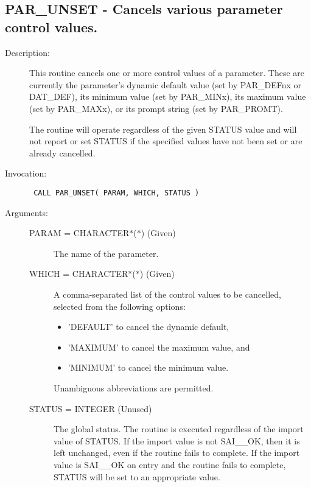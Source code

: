 \documentclass[twoside,11pt]{article}
\newcommand{\xlabel}[1]{}
\newlength{\sstbannerlength}
\newlength{\sstcaptionlength}
\newlength{\sstexampleslength}
\newlength{\sstexampleswidth}
\newcommand{\sstroutine}[3]{
   \goodbreak
   \rule{\textwidth}{0.5mm}
   \vspace{-7ex}
   \newline
   \settowidth{\sstbannerlength}{{\Large {\bf #1}}}
   \setlength{\sstcaptionlength}{\textwidth}
   \setlength{\sstexampleslength}{\textwidth}
   \addtolength{\sstbannerlength}{0.5em}
   \addtolength{\sstcaptionlength}{-2.0\sstbannerlength}
   \addtolength{\sstcaptionlength}{-5.0pt}
   \settowidth{\sstexampleswidth}{{\bf Examples:}}
   \addtolength{\sstexampleslength}{-\sstexampleswidth}
   \parbox[t]{\sstbannerlength}{\flushleft{\Large {\bf #1}}}
   \parbox[t]{\sstcaptionlength}{\center{\Large #2}}
   \parbox[t]{\sstbannerlength}{\flushright{\Large {\bf #1}}}
   \begin{description}
      #3
   \end{description}
}
\newcommand{\sstdescription}[1]{\item[Description:] #1}
\newcommand{\sstinvocation}[1]{\item[Invocation:]\hspace{0.4em}{\tt #1}}
\newcommand{\sstarguments}[1]{
   \item[Arguments:] \mbox{} \\
   \vspace{-3.5ex}
   \begin{description}
      #1
   \end{description}
}
\newcommand{\sstsubsection}[1]{ \item[{#1}] \mbox{} \\}
\newcommand{\ssttt}{\tt}
\renewcommand{\sstroutine}[3]{
      \subsection{\xlabel{12}#1\xlabel{#1}-\label{#1}#2}
      \begin{description}
         #3
      \end{description}
   }
\renewcommand{\sstdescription}[1]{\item[Description:]
      \begin{description}
         #1
      \end{description}
   }
\renewcommand{\sstinvocation}[1]{\item[Invocation:]
      \begin{description}
         {\ssttt #1}
      \end{description}
   }
\renewcommand{\sstarguments}[1]{
      \item[Arguments:]
      \begin{description}
         #1
      \end{description}
   }
\renewcommand{\sstsubsection}[1]{\item[{#1}]}
\begin{document}
\sstroutine{
   PAR\_UNSET
}{
   Cancels various parameter control values.
}{
   \sstdescription{
      This routine cancels one or more control values of a parameter.
      These are currently the parameter's dynamic default value (set by
      PAR\_DEFnx or DAT\_DEF), its minimum value (set by PAR\_MINx), its
      maximum value (set by PAR\_MAXx), or its prompt string (set by
      PAR\_PROMT).

      The routine will operate regardless of the given STATUS value and will
      not report or set STATUS if the specified values have not been set or
      are already cancelled.
   }
   \sstinvocation{
      CALL PAR\_UNSET( PARAM, WHICH, STATUS )
   }
   \sstarguments{
      \sstsubsection{
         PARAM = CHARACTER$*$($*$) (Given)
      }{
         The name of the parameter.
      }
      \sstsubsection{
         WHICH = CHARACTER$*$($*$) (Given)
      }{
         A comma-separated list of the control values to be cancelled,
         selected from the following options:
      \begin{itemize}
            \item 'DEFAULT' to cancel the dynamic default,
            \item 'MAXIMUM' to cancel the maximum value, and
            \item 'MINIMUM' to cancel the minimum value.
      \end{itemize}
      Unambiguous abbreviations are permitted.
      }
      \sstsubsection{
         STATUS = INTEGER (Unused)
      }{
         The global status.  The routine is executed regardless of the
         import value of STATUS.  If the import value is not SAI\_\_OK,
         then it is left unchanged, even if the routine fails to
         complete.  If the import value is SAI\_\_OK on entry and the
         routine fails to complete, STATUS will be set to an
         appropriate value.
      }
   }
}
\end{document}
